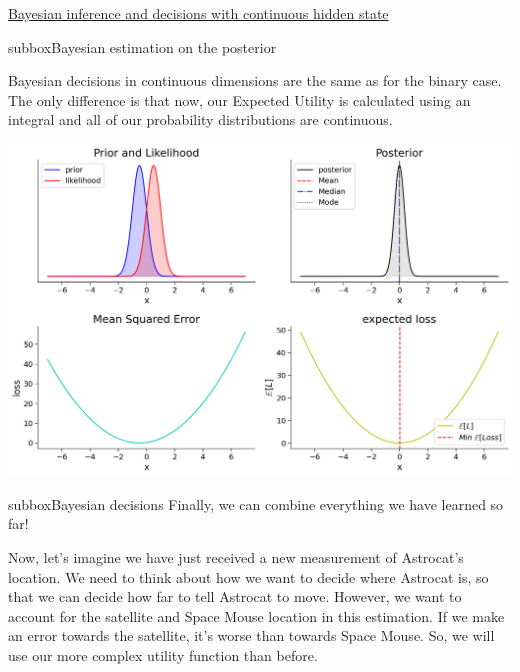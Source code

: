 \begin{textbox}{\href{https://compneuro.neuromatch.io/tutorials/W3D1_BayesianDecisions/student/W3D1_Tutorial2.html}{Bayesian inference and decisions with continuous hidden state } }
\begin{subbox}{subbox}{Bayesian estimation on the posterior}
\scriptsize


Bayesian decisions in continuous dimensions are the same as for the binary case. The only difference is that now, our Expected Utility is calculated using an integral and all of our probability distributions are continuous.
\begin{center}
    
\includegraphics[scale=0.23]{Figures/BD/BD_Figure12.png}
\end{center}
\end{subbox}
\begin{subbox}{subbox}{Bayesian decisions}
\scriptsize
Finally, we can combine everything we have learned so far! 

Now, let's imagine we have just received a new measurement of Astrocat's location. We need to think about how we want to decide where Astrocat is, so that we can decide how far to tell Astrocat to move. However, we want to account for the satellite and Space Mouse location in this estimation. If we make an error towards the satellite, it's worse than towards Space Mouse. So, we will use our more complex utility function than before. 

\begin{center}
    

\end{center}
\end{subbox}
\end{textbox}
